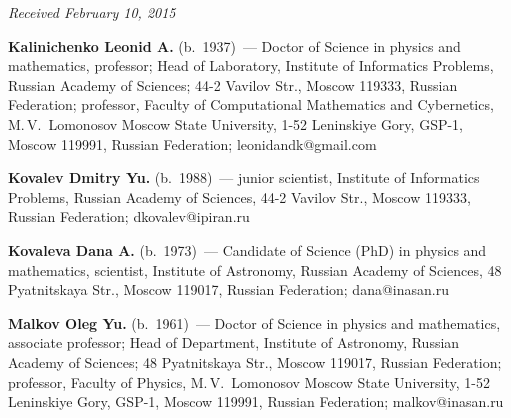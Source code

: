 \hfill{\small\textit{Received February 10, 2015}}

\vspace*{-36pt}

\Contr

\noindent
\textbf{Kalinichenko Leonid A.} (b.\ 1937)~--- Doctor of Science in physics and mathematics, professor;
Head of Laboratory, Institute of Informatics Problems, Russian Academy of Sciences; 44-2 Vavilov Str.,
Moscow 119333, Russian Federation; professor, Faculty of Computational Mathematics and
Cybernetics, M.\,V.~Lomonosov Moscow State University, 1-52 Leninskiye Gory, GSP-1, Moscow
119991, Russian Federation; leonidandk@gmail.com

\vspace*{3pt}

\noindent
\textbf{Kovalev Dmitry Yu.} (b.\ 1988)~--- junior scientist, Institute of Informatics Problems, Russian
Academy of Sciences, 44-2 Vavilov Str., Moscow 119333, Russian Federation;
dkovalev@ipiran.ru


\vspace*{3pt}

\noindent
\textbf{Kovaleva Dana A.} (b.\ 1973)~--- Candidate of Science (PhD)
in physics and mathematics, scientist, Institute of
Astronomy, Russian Academy of Sciences, 48 Pyatnitskaya Str., Moscow 119017, Russian Federation;
dana@inasan.ru

\vspace*{3pt}

\noindent
\textbf{Malkov Oleg Yu.} (b.\ 1961)~---
Doctor of Science in physics and mathematics, associate professor; Head of Department, Institute of
Astronomy, Russian Academy of Sciences; 48 Pyatnitskaya Str., Moscow 119017, Russian Federation;
professor, Faculty of Physics, M.\,V.~Lomonosov Moscow State University, 1-52 Leninskiye Gory, GSP-1,
Moscow 119991, Russian Federation; malkov@inasan.ru






\newpage

\vspace*{-18pt}


\def\tit{МЕТОДЫ И~СРЕДСТВА ПОДДЕРЖКИ ИССЛЕДОВАНИЙ, ДВИЖИМЫХ ГИПОТЕЗАМИ: ОБЗОР}

